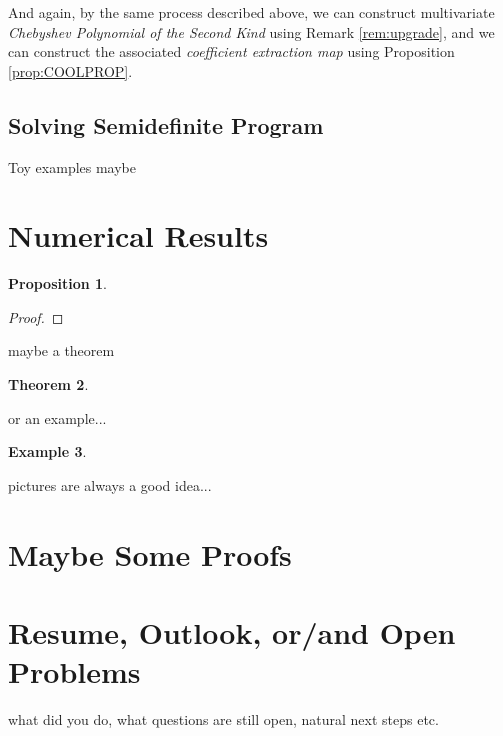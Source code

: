 \documentclass[12pt]{amsart}
\numberwithin{equation}{section}
\newtheorem{thm}{Theorem}
\newtheorem{prop}[thm]{Proposition}
\theoremstyle{definition}
\newtheorem{example}[thm]{Example}
\numberwithin{thm}{section}
\begin{document}
And again, by the same process described above, we can construct multivariate \emph{Chebyshev Polynomial of the Second Kind} using Remark \ref{rem:upgrade},
and we can construct the associated \emph{coefficient extraction map} using Proposition \ref{prop:COOLPROP}.




\subsection{Solving Semidefinite Program}
\label{Sec:Solving Semidefinite Program}




Toy examples maybe

\newpage
\section{Numerical Results}


\begin{prop}

\end{prop}

\begin{proof}

\end{proof}

maybe a theorem


\begin{thm}

\end{thm}

or an example...
\begin{example}

\end{example}

pictures are always a good idea...



\newpage
\section{Maybe Some Proofs}


\newpage
\section{Resume, Outlook, or/and Open Problems}
\label{Sec:Outlook}


what did you do, what questions are still open, natural next steps etc. 



\newpage


\end{document}
